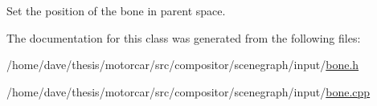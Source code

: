 Set the position of the bone in parent space. 



The documentation for this class was generated from the following files\-:\begin{DoxyCompactItemize}
\item 
/home/dave/thesis/motorcar/src/compositor/scenegraph/input/\hyperlink{bone_8h}{bone.\-h}\item 
/home/dave/thesis/motorcar/src/compositor/scenegraph/input/\hyperlink{bone_8cpp}{bone.\-cpp}\end{DoxyCompactItemize}
